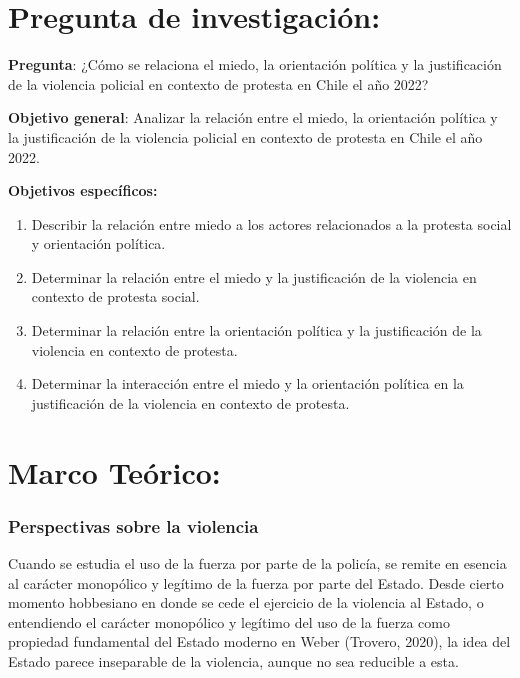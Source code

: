 \documentclass[12pt,twoside]{templates/facsothesis}
\begin{document}
\hypertarget{pregunta-de-investigaciuxf3n}{%
\chapter{Pregunta de investigación:}\label{pregunta-de-investigaciuxf3n}}

\textbf{Pregunta}: ¿Cómo se relaciona el miedo, la orientación política y la justificación de la violencia policial en contexto de protesta en Chile el año 2022?

\textbf{Objetivo general}: Analizar la relación entre el miedo, la orientación política y la justificación de la violencia policial en contexto de protesta en Chile el año 2022.

\textbf{Objetivos específicos:}

\begin{enumerate}
\def\labelenumi{\arabic{enumi}.}
\item
  Describir la relación entre miedo a los actores relacionados a la protesta social y orientación política.
\item
  Determinar la relación entre el miedo y la justificación de la violencia en contexto de protesta social.
\item
  Determinar la relación entre la orientación política y la justificación de la violencia en contexto de protesta.
\item
  Determinar la interacción entre el miedo y la orientación política en la justificación de la violencia en contexto de protesta.
\end{enumerate}

\hypertarget{marco-teuxf3rico}{%
\chapter{Marco Teórico:}\label{marco-teuxf3rico}}

\hypertarget{perspectivas-sobre-la-violencia}{%
\subsection{Perspectivas sobre la violencia}\label{perspectivas-sobre-la-violencia}}

Cuando se estudia el uso de la fuerza por parte de la policía, se remite en esencia al carácter monopólico y legítimo de la fuerza por parte del Estado. Desde cierto momento hobbesiano en donde se cede el ejercicio de la violencia al Estado, o entendiendo el carácter monopólico y legítimo del uso de la fuerza como propiedad fundamental del Estado moderno en Weber (Trovero, 2020), la idea del Estado parece inseparable de la violencia, aunque no sea reducible a esta.
\end{document}
